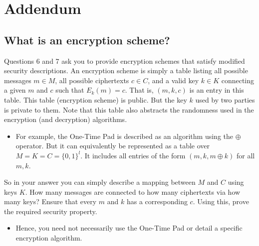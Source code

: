 \documentclass[10pt]{exam}
\begin{document}
\section{Addendum}

\subsection*{What is an encryption scheme?} 

Questions 6 and 7 ask you to provide encryption schemes that satisfy modified security descriptions. An encryption scheme is simply a  table listing all possible messages $m \in M$, all possible ciphertexts $c \in C$, and a valid key $k\in K$ connecting a given $m$ and $c$ such that $E_k(m)=c$. That is, $(m,k,c)$ is an entry in this table. This table (encryption scheme) is public. But the key $k$ used by two parties is private to them. Note that this table also abstracts the randomness used in the encryption (and decryption) algorithms. 
\begin{itemize}
    \item For example, the One-Time Pad is described as an algorithm using the $\oplus$ operator. But it can equivalently be represented as a table over $M=K=C=\{0,1\}^l$. It includes all entries of the form $(m,k,m\oplus k)$ for all $m,k$.
\end{itemize}

\bigskip 

So in your answer you can simply describe a mapping between $M$ and $C$ using keys $K$. How many messages are connected to how many ciphertexts via how many keys? Ensure that every $m$ and $k$ has a corresponding $c$. Using this, prove the required security property. 
\begin{itemize}
    \item Hence, you need not necessarily use the One-Time Pad or detail a specific encryption algorithm.
\end{itemize}
\end{document}
